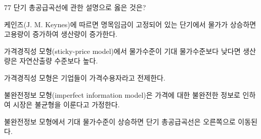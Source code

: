 \begin{question}{77}
단기 총공급곡선에 관한 설명으로 옳은 것은?
\begin{choices}
  \item 케인즈(J. M. Keynes)에 따르면 명목임금이 고정되어 있는 단기에서 물가가 상승하면 고용량이 증가하여 생산량이 증가한다.
  \item 가격경직성 모형(sticky-price model)에서 물가수준이 기대 물가수준보다 낮다면 생산량은 자연산출량 수준보다 높다.
  \item 가격경직성 모형은 기업들이 가격수용자라고 전제한다.
  \item 불완전정보 모형(imperfect information model)은 가격에 대한 불완전한 정보로 인하여 시장은 불균형을 이룬다고 가정한다.
  \item 불완전정보 모형에서 기대 물가수준이 상승하면 단기 총공급곡선은 오른쪽으로 이동된다.
\end{choices}
\end{question}

